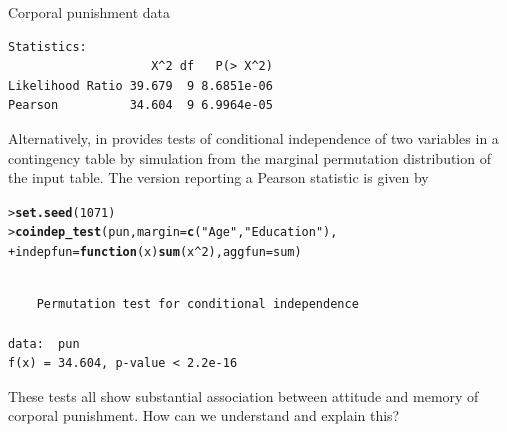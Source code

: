 \documentclass[10pt,krantz2]{krantz}\usepackage[]{graphicx}\usepackage[]{color}
\makeatletter
\newcommand{\hlnum}[1]{\textcolor[rgb]{0.686,0.059,0.569}{#1}}%
\newcommand{\hlstr}[1]{\textcolor[rgb]{0.192,0.494,0.8}{#1}}%
\newcommand{\hlopt}[1]{\textcolor[rgb]{0,0,0}{#1}}%
\newcommand{\hlstd}[1]{\textcolor[rgb]{0.345,0.345,0.345}{#1}}%
\newcommand{\hlkwa}[1]{\textcolor[rgb]{0.161,0.373,0.58}{\textbf{#1}}}%
\newcommand{\hlkwc}[1]{\textcolor[rgb]{0.333,0.667,0.333}{#1}}%
\newcommand{\hlkwd}[1]{\textcolor[rgb]{0.737,0.353,0.396}{\textbf{#1}}}%
\newenvironment{kframe}{%
 \def\at@end@of@kframe{}%
 \ifinner\ifhmode%
  \def\at@end@of@kframe{\end{minipage}}%
  \begin{minipage}{\columnwidth}%
 \fi\fi%
 \def\FrameCommand##1{\hskip\@totalleftmargin \hskip-\fboxsep
 \colorbox{shadecolor}{##1}\hskip-\fboxsep
     \hskip-\linewidth \hskip-\@totalleftmargin \hskip\columnwidth}%
 \MakeFramed {\advance\hsize-\width
   \@totalleftmargin\z@ \linewidth\hsize
   \@setminipage}}%
 {\par\unskip\endMakeFramed%
 \at@end@of@kframe}
\newenvironment{knitrout}{}{} %
\renewenvironment{knitrout}{\small\renewcommand{\baselinestretch}{.85}}{} %
\makeatother
\begin{document}
\begin{Example}[punish]{Corporal punishment data}
\begin{knitrout}
\begin{kframe}
\begin{verbatim}
Statistics:
                    X^2 df   P(> X^2)
Likelihood Ratio 39.679  9 8.6851e-06
Pearson          34.604  9 6.9964e-05
\end{verbatim}
\end{kframe}
\end{knitrout}
Alternatively,  in 
provides tests of conditional independence of two variables in a contingency table by simulation from the marginal permutation
distribution of the input table.  The version reporting a Pearson \chisq
statistic is given by
\begin{knitrout}
\color{fgcolor}\begin{kframe}
\begin{alltt}
\hlstd{> }\hlkwd{set.seed}\hlstd{(}\hlnum{1071}\hlstd{)}
\hlstd{> }\hlkwd{coindep_test}\hlstd{(pun,} \hlkwc{margin} \hlstd{=} \hlkwd{c}\hlstd{(}\hlstr{"Age"}\hlstd{,} \hlstr{"Education"}\hlstd{),}
\hlstd{+ }             \hlkwc{indepfun} \hlstd{=} \hlkwa{function}\hlstd{(}\hlkwc{x}\hlstd{)} \hlkwd{sum}\hlstd{(x} \hlopt{^} \hlnum{2}\hlstd{),} \hlkwc{aggfun} \hlstd{= sum)}
\end{alltt}
\begin{verbatim}

	Permutation test for conditional independence

data:  pun
f(x) = 34.604, p-value < 2.2e-16
\end{verbatim}
\end{kframe}
\end{knitrout}
These tests all show substantial association between attitude and memory of corporal
punishment.  How can we understand and explain this?


\end{Example}
\end{document}
